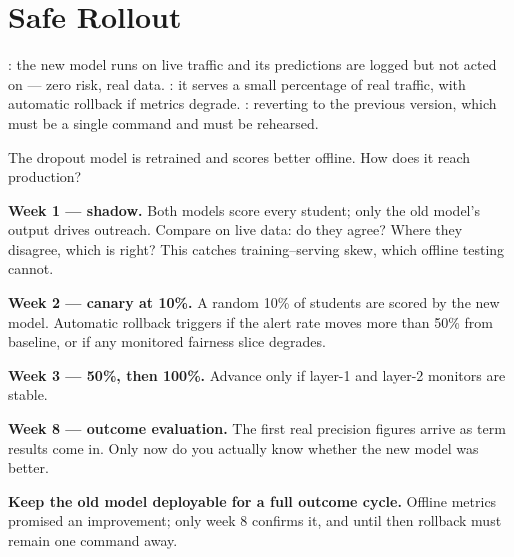 \section{Safe Rollout}

\begin{definitionbox}
: the new model runs on live traffic and its predictions are logged
but not acted on --- zero risk, real data. : it serves a small
percentage of real traffic, with automatic rollback if metrics degrade.
: reverting to the previous version, which must be a single command
and must be rehearsed.
\end{definitionbox}

\begin{worked}
The dropout model is retrained and scores better offline. How does it reach
production?

\smallskip
\textbf{Week 1 --- shadow.} Both models score every student; only the old model's
output drives outreach. Compare on live data: do they agree? Where they disagree,
which is right? This catches training--serving skew, which offline testing cannot.

\textbf{Week 2 --- canary at 10\%.} A random 10\% of students are scored by the new
model. Automatic rollback triggers if the alert rate moves more than 50\% from
baseline, or if any monitored fairness slice degrades.

\textbf{Week 3 --- 50\%, then 100\%.} Advance only if layer-1 and layer-2 monitors
are stable.

\textbf{Week 8 --- outcome evaluation.} The first real precision figures arrive as
term results come in. Only now do you actually know whether the new model was
better.

\smallskip
\textbf{Keep the old model deployable for a full outcome cycle.} Offline metrics
promised an improvement; only week 8 confirms it, and until then rollback must
remain one command away.
\end{worked}

